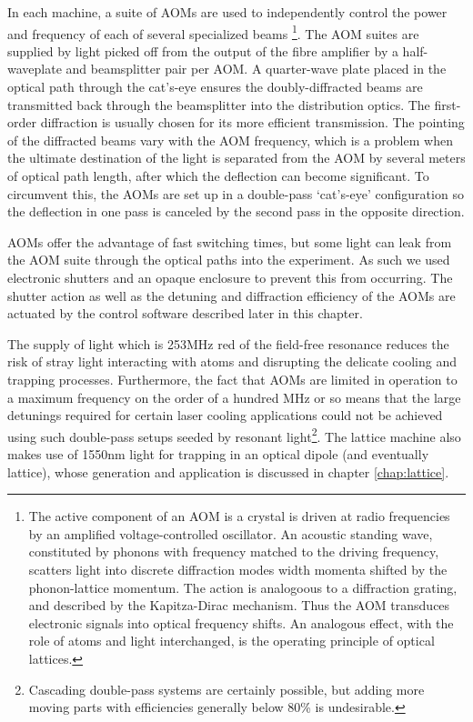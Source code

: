 	In each machine, a suite of AOMs are used to independently control the power and frequency of each of several specialized beams \footnote{The active component of an AOM is a crystal is driven at radio frequencies by an amplified voltage-controlled oscillator.	An acoustic standing wave, constituted by phonons with frequency matched to the driving frequency, scatters light into discrete diffraction modes width momenta shifted by the phonon-lattice momentum.	The action is analogoous to a diffraction grating, and described by the Kapitza-Dirac mechanism.	Thus the AOM transduces electronic signals into optical frequency shifts.	An analogous effect, with the role of atoms and light interchanged, is the operating principle of optical lattices.}.
	The AOM suites are supplied by light picked off from the output of the fibre amplifier by a half-waveplate and beamsplitter pair per AOM.
	A quarter-wave plate placed in the optical path through the cat's-eye ensures the doubly-diffracted beams are transmitted back through the beamsplitter into the distribution optics.
	The first-order diffraction is usually chosen for its more efficient transmission.
	The pointing of the diffracted beams vary with the AOM frequency, which is a problem when the ultimate destination of the light is separated from the AOM by several meters of optical path length, after which the deflection can become significant.
	To circumvent this, the AOMs are set up in a double-pass `cat's-eye' configuration so the deflection in one pass is canceled by the second pass in the opposite direction.
	
	AOMs offer the advantage of fast switching times, but some light can leak from the AOM suite through the optical paths into the experiment.
	As such we used electronic shutters and an opaque enclosure to prevent this from occurring.
	The shutter action as well as the detuning and diffraction efficiency of the AOMs are actuated by the control software described later in this chapter.
	
	The supply of light which is 253MHz red of the field-free resonance reduces the risk of stray light interacting with atoms and disrupting the delicate cooling and trapping processes.
	Furthermore, the fact that AOMs are limited in operation to a maximum frequency on the order of a hundred MHz or so means that the large detunings required for certain laser cooling applications could not be achieved using such double-pass setups seeded by resonant light\footnote{Cascading double-pass systems are certainly possible, but adding more moving parts with efficiencies generally below 80\% is undesirable.}.
	The lattice machine also makes use of 1550nm light for trapping in an optical dipole (and eventually lattice), whose generation and application is discussed in chapter \ref{chap:lattice}.	


